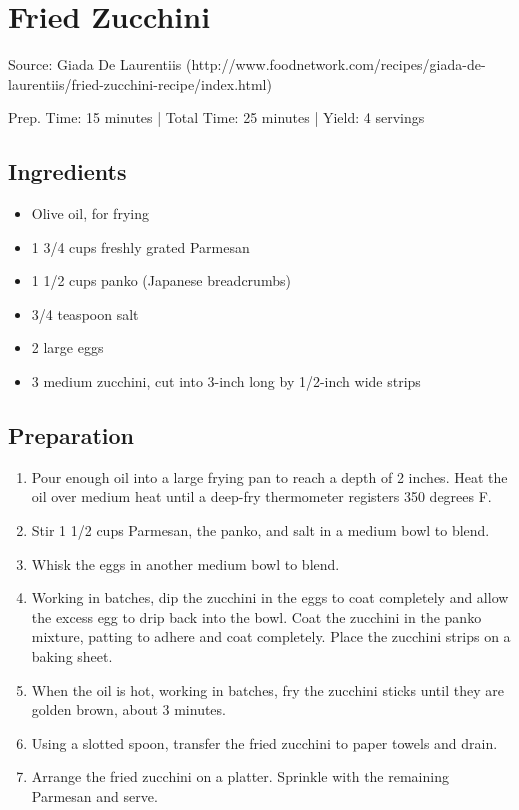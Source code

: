 \section{Fried Zucchini}

Source: Giada De Laurentiis (http://www.foodnetwork.com/recipes/giada-de-laurentiis/fried-zucchini-recipe/index.html)

\begin{center}
Prep. Time: 15 minutes |
Total Time: 25 minutes | 
Yield: 4 servings
\end{center}

\subsection{Ingredients}
\begin{multicols}{2}
\begin{itemize}
    \item Olive oil, for frying
    \item 1 3/4 cups freshly grated Parmesan
    \item 1 1/2 cups panko (Japanese breadcrumbs)
    \item 3/4 teaspoon salt
    \item 2 large eggs
    \item 3 medium zucchini, cut into 3-inch long by 1/2-inch wide strips
\end{itemize}
\end{multicols}

\subsection{Preparation}
\begin{enumerate}
    \item Pour enough oil into a large frying pan to reach a depth of 2 inches. Heat the oil over medium heat until a deep-fry thermometer registers 350 degrees F.
    \item Stir 1 1/2 cups Parmesan, the panko, and salt in a medium bowl to blend.
    \item Whisk the eggs in another medium bowl to blend. 
    \item Working in batches, dip the zucchini in the eggs to coat completely and allow the excess egg to drip back into the bowl. Coat the zucchini in the panko mixture, patting to adhere and coat completely. Place the zucchini strips on a baking sheet.
    \item When the oil is hot, working in batches, fry the zucchini sticks until they are golden brown, about 3 minutes.
    \item Using a slotted spoon, transfer the fried zucchini to paper towels and drain.
    \item Arrange the fried zucchini on a platter. Sprinkle with the remaining Parmesan and serve.
\end{enumerate}
